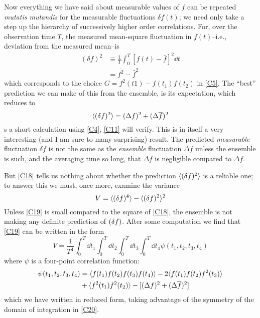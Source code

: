 Now everything we have said about measurable values of $f$ can be repeated \emph{mutatis mutandis} for the measurable fluctuations $\delta f(t)$; we need only take a step up the hierarchy of successively higher order correlations.
For, over the observation time $T$, the measured mean-square fluctuation in $f(t)$--i.e., deviation from the measured mean--is
\begin{align}
	(\delta f)^2 &\equiv \frac{1}{T} \int_{0}^{T} [f(t) - \bar{f}]^2 \dd t \\
	&= \bar{f^2} - \bar{f}^2
\end{align}
which corresponds to the choice $G = f^2(t1) - f(t_1)f(t_2)$ in \eqref{C5}.
The ``best'' prediction we can make of this from the ensemble, is its expectation, which reduces to
\begin{equation}
	\label{C18}
	\langle(\delta f)^2\rangle = (\Delta f)^2 + (\Delta \overline{f})^2
\end{equation}
s a short calculation using \eqref{C4}, \eqref{C11} will verify.
This is in itself a very interesting (and I am sure to many surprising) result.
The predicted \emph{measurable} fluctuation $\delta f$ is not the same as the \emph{ensemble} fluctuation $\Delta f$ unless the ensemble is such, and the averaging time so long, that $\Delta \bar{f}$ is negligible compared to $\Delta f$.

But \eqref{C18} tells us nothing about whether the prediction $\langle(\delta f)^2\rangle$ is a reliable one; to answer this we must, once more, examine the variance
\begin{equation}
	\label{C19}
	V = \langle(\mathop{}\!\delta f)^4\rangle - \langle(\mathop{}\!\delta f)^2\rangle^2
\end{equation}
Unless \eqref{C19} is small compared to the square of \eqref{C18}, the ensemble is not making any definite prediction of $(\mathop{}\!\delta f)$.
After some computation we find that \eqref{C19} can be written in the form
\begin{equation}
	\label{C20}
	V = \frac{1}{T^4} \int_{0}^{T} \dd t_1 \int_{0}^{T} \dd t_2 \int_{0}^{T} \dd t_3 \int_{0}^{T} \dd t_4 \psi(t_1, t_2, t_3, t_4)
\end{equation}
where $\psi$ is a four-point correlation function:
\begin{equation}
	\label{C21}
	\begin{split}
		\psi(t_1, t_2, t_3, t_4)
			&=  \langle f(t_1)f(t_2)f(t_3)f(t_4)\rangle - 2\langle f(t_1)f(t_2)f^2(t_3)\rangle \\
			& + \langle f^2(t_1)f^2(t_2)\rangle - [(\mathop{}\!\Delta f)^2 + (\mathop{}\!\Delta \overline{f})^2]
	\end{split}
\end{equation}
which we have written in reduced form, taking advantage of the symmetry of the domain of integration in \eqref{C20}.


